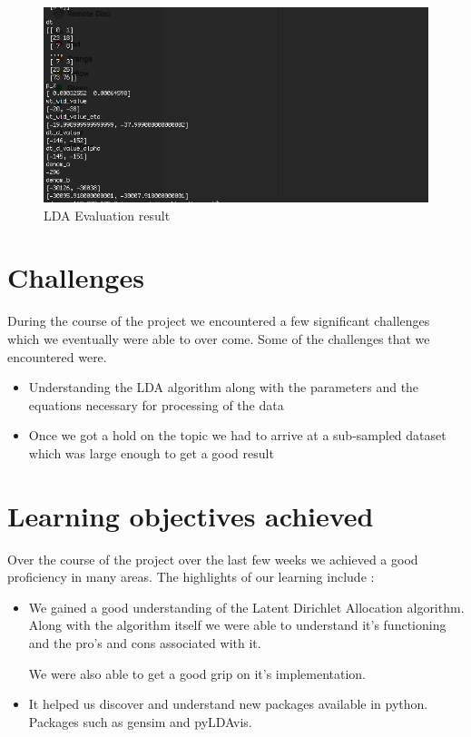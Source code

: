 \documentclass{article}
\begin{document}
\begin{figure}[ht]
	\centerline{\includegraphics[width=\columnwidth]{lda}}
	\caption{LDA Evaluation result}
	\label{lda}
	\vskip 0.15in
\end{figure} 
 

\section{Challenges}
	\label{challenges}
	
	During the course of the project we encountered a few significant challenges which we eventually were able to over come. Some of the challenges that we encountered were. 
	
	\begin{itemize}
		\item{Understanding the LDA algorithm along with the parameters and the equations necessary for processing of the data}
		\item{Once we got a hold on the topic we had to arrive at a sub-sampled dataset which was large enough to get a good result}
	\end{itemize}
\section{Learning objectives achieved}
	\label{learning}
	Over the course of the project over the last few weeks we achieved a good proficiency in many areas. The highlights of our learning include :
	
	\begin{itemize}
		\item{We gained a good understanding of the Latent Dirichlet Allocation algorithm. Along with the algorithm itself we 				were able to understand it's functioning and the pro's and cons associated with it. 
		
			We were also able to get a good grip on it's implementation.}
		
		\item{It helped us discover and understand new packages available in python. Packages such as gensim and 					pyLDAvis.}
	\end{itemize}
	
\end{document}
